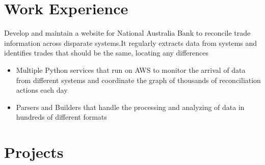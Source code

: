 \documentclass{resume}
\begin{document}
\section{Work Experience}
\begin{flushleft}
Develop and maintain a website for National Australia Bank to reconcile trade information across disparate systems.\linebreak It regularly extracts data from systems and identifies trades that should be the same, locating any differences
\begin{itemize}
  \item Multiple Python services that run on AWS to monitor the arrival of data from different systems and \linebreak coordinate the graph of thousands of reconciliation actions each day
  \item Parsers and Builders that handle the processing and analyzing of data in hundreds of different formats
\end{itemize}
\end{flushleft}

\section{Projects}
\end{document}
